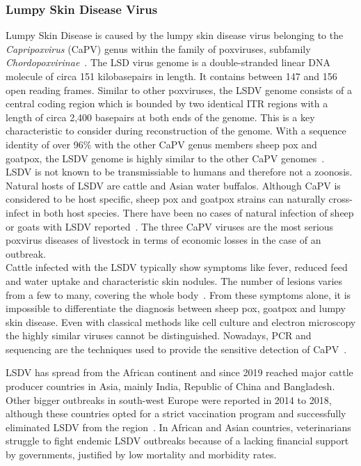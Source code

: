\subsubsection*{Lumpy Skin Disease Virus}
Lumpy Skin Disease is caused by the lumpy skin disease virus belonging to the \textit{Capripoxvirus} (CaPV) genus within the family of poxviruses, subfamily \textit{Chordopoxvirinae}~\cite{walker2019changes}. The \ac{LSD} virus genome is a double-stranded linear \ac{DNA} molecule of circa 151 kilobasepairs in length. It contains between 147 and 156 open reading frames. Similar to other poxviruses, the \ac{LSDV} genome consists of a central coding region which is bounded by two identical \ac{ITR} regions with a length of circa 2,400 basepairs at both ends of the genome. This is a key characteristic to consider during reconstruction of the genome. With a sequence identity of over 96\% with the other \acs{CaPV} genus members sheep pox and goatpox, the \ac{LSDV} genome is highly similar to the other \acs{CaPV} genomes~\cite{tulman2001genome}. \\
\ac{LSDV} is not known to be transmissiable to humans and therefore not a zoonosis. Natural hosts of \ac{LSDV} are cattle and Asian water buffalos. Although \acs{CaPV} is considered to be host specific, sheep pox and goatpox strains can naturally cross-infect in both host species. There have been no cases of natural infection of sheep or goats with \ac{LSDV} reported~\cite{namazi2021lumpy}. The three \acs{CaPV} viruses are the most serious poxvirus diseases of livestock in terms of economic losses in the case of an outbreak. \\
Cattle infected with the \ac{LSDV} typically show symptoms like fever, reduced feed and water uptake and characteristic skin nodules. The number of lesions varies from a few to many, covering the whole body~\cite{prozesky1982study}. From these symptoms alone, it is impossible to differentiate the diagnosis between sheep pox, goatpox and lumpy skin disease. Even with classical methods like cell culture and electron microscopy the highly similar viruses cannot be distinguished. Nowadays, \ac{PCR} and sequencing are the techniques used to provide the sensitive detection of \acs{CaPV}~\cite{lafar2020capripoxvirus}.

\ac{LSDV} has spread from the African continent and since 2019 reached major cattle producer countries in Asia, mainly India, Republic of China and Bangladesh. Other bigger outbreaks in south-west Europe were reported in 2014 to 2018, although these countries opted for a strict vaccination program and successfully eliminated \ac{LSDV} from the region~\cite{prevention2017control}. In African and Asian countries, veterinarians struggle to fight endemic \ac{LSDV} outbreaks because of a lacking financial support by governments, justified by low mortality and morbidity rates.

